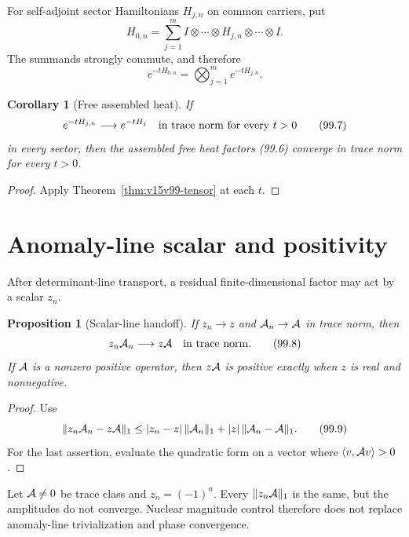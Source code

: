 \documentclass[11pt]{article}
\newtheorem{proposition}[theorem]{Proposition}
\newtheorem{corollary}[theorem]{Corollary}
\theoremstyle{remark}
\begin{document}
For self-adjoint sector Hamiltonians \(H_{j,n}\) on common carriers,
put
\[
 H_{0,n}
 =\sum_{j=1}^m
 I\otimes\cdots\otimes H_{j,n}\otimes\cdots\otimes I. \tag{99.5}
\]
The summands strongly commute, and therefore
\[
 e^{-tH_{0,n}}
 =\bigotimes_{j=1}^m e^{-tH_{j,n}}.                   \tag{99.6}
\]

\begin{corollary}[Free assembled heat]
\label{cor:v15v99-free}
If
\[
 e^{-tH_{j,n}}\longrightarrow e^{-tH_j}
 \quad\hbox{in trace norm for every }t>0              \tag{99.7}
\]
in every sector, then the assembled free heat factors (99.6)
converge in trace norm for every \(t>0\).
\end{corollary}

\begin{proof}
Apply Theorem~\ref{thm:v15v99-tensor} at each \(t\).
\end{proof}

\section{Anomaly-line scalar and positivity}

After determinant-line transport, a residual finite-dimensional
factor may act by a scalar \(z_n\).

\begin{proposition}[Scalar-line handoff]
\label{prop:v15v99-line}
If \(z_n\to z\) and \({\cal A}_n\to{\cal A}\) in trace norm, then
\[
 z_n{\cal A}_n\longrightarrow z{\cal A}
 \quad\hbox{in trace norm}.                            \tag{99.8}
\]
If \({\cal A}\) is a nonzero positive operator, then
\(z{\cal A}\) is positive exactly when \(z\) is real and
nonnegative.
\end{proposition}

\begin{proof}
Use
\[
 \|z_n{\cal A}_n-z{\cal A}\|_1
 \leq|z_n-z|\,\|{\cal A}_n\|_1
      +|z|\,\|{\cal A}_n-{\cal A}\|_1.                \tag{99.9}
\]
For the last assertion, evaluate the quadratic form on a vector
where \(\langle v,{\cal A}v\rangle>0\).
\end{proof}

\begin{counterexample}
\label{cnt:v15v99-phase}
Let \({\cal A}\ne0\) be trace class and \(z_n=(-1)^n\).  Every
\(\|z_n{\cal A}\|_1\) is the same, but the amplitudes do not
converge.  Nuclear magnitude control therefore does not replace
anomaly-line trivialization and phase convergence.
\end{counterexample}
\end{document}
